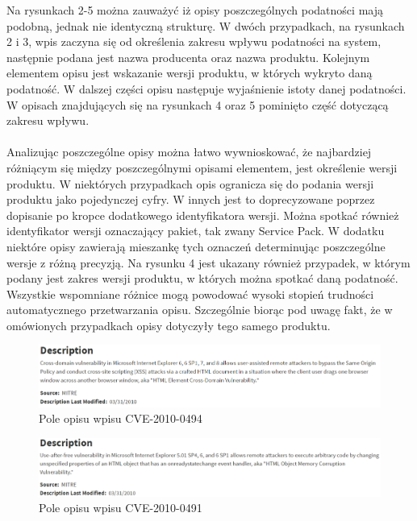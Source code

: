 \documentclass[a4paper,12pt,twoside]{article}
\begin{document}
Na rysunkach 2-5 można zauważyć iż opisy poszczególnych podatności mają podobną, jednak nie identyczną strukturę. W dwóch przypadkach, na rysunkach 2 i 3, wpis zaczyna się od określenia zakresu wpływu podatności na system, następnie podana jest nazwa producenta oraz nazwa produktu. Kolejnym elementem opisu jest wskazanie wersji produktu, w których wykryto daną podatność. W dalszej części opisu następuje wyjaśnienie istoty danej podatności. W opisach znajdujących się na rysunkach 4 oraz 5 pominięto część dotyczącą zakresu wpływu. 

\paragraph{}
Analizując poszczególne opisy można łatwo wywnioskować, że najbardziej różniącym się między poszczególnymi opisami elementem, jest określenie wersji produktu. W niektórych przypadkach opis ogranicza się do podania wersji produktu jako pojedynczej cyfry. W innych jest to doprecyzowane poprzez dopisanie po kropce dodatkowego identyfikatora wersji. Można spotkać również identyfikator wersji oznaczający pakiet, tak zwany Service Pack. W dodatku niektóre opisy zawierają mieszankę tych oznaczeń determinując poszczególne wersje z różną precyzją. Na rysunku 4 jest ukazany również przypadek, w którym podany jest zakres wersji produktu, w których można spotkać daną podatność. Wszystkie wspomniane różnice mogą powodować wysoki stopień trudności automatycznego przetwarzania opisu. Szczególnie biorąc pod uwagę fakt, że w omówionych przypadkach opisy dotyczyły tego samego produktu.

\begin{figure}[h]
    \centering
    \includegraphics[width=1.0\textwidth]{image/002CVE20100494.png}
    \caption{Pole opisu wpisu CVE-2010-0494}
\end{figure}

\begin{figure}[h]
    \centering
    \includegraphics[width=1.0\textwidth]{image/003CVE20100491.png}
    \caption{Pole opisu wpisu CVE-2010-0491}
\end{figure}
\end{document}
